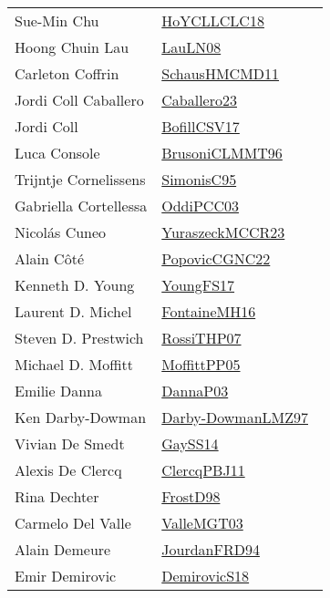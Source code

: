 {\begin{longtable}{p{4cm}p{20cm}}
Sue{-}Min Chu & \href{papers/HoYCLLCLC18.pdf}{HoYCLLCLC18}~\cite{HoYCLLCLC18}\\
Hoong Chuin Lau & \href{papers/LauLN08.pdf}{LauLN08}~\cite{LauLN08}\\
Carleton Coffrin & \href{articles/SchausHMCMD11.pdf}{SchausHMCMD11}~\cite{SchausHMCMD11}\\
Jordi Coll Caballero & \href{articles/Caballero23.pdf}{Caballero23}~\cite{Caballero23}\\
Jordi Coll & \href{papers/BofillCSV17.pdf}{BofillCSV17}~\cite{BofillCSV17}\\
Luca Console & \href{papers/BrusoniCLMMT96.pdf}{BrusoniCLMMT96}~\cite{BrusoniCLMMT96}\\
Trijntje Cornelissens & \href{papers/SimonisC95.pdf}{SimonisC95}~\cite{SimonisC95}\\
Gabriella Cortellessa & \href{papers/OddiPCC03.pdf}{OddiPCC03}~\cite{OddiPCC03}\\
Nicol{\'{a}}s Cuneo & \href{articles/YuraszeckMCCR23.pdf}{YuraszeckMCCR23}~\cite{YuraszeckMCCR23}\\
Alain C{\^{o}}t{\'{e}} & \href{papers/PopovicCGNC22.pdf}{PopovicCGNC22}~\cite{PopovicCGNC22}\\
Kenneth D. Young & \href{papers/YoungFS17.pdf}{YoungFS17}~\cite{YoungFS17}\\
Laurent D. Michel & \href{papers/FontaineMH16.pdf}{FontaineMH16}~\cite{FontaineMH16}\\
Steven D. Prestwich & \href{papers/RossiTHP07.pdf}{RossiTHP07}~\cite{RossiTHP07}\\
Michael D. Moffitt & \href{papers/MoffittPP05.pdf}{MoffittPP05}~\cite{MoffittPP05}\\
Emilie Danna & \href{papers/DannaP03.pdf}{DannaP03}~\cite{DannaP03}\\
Ken Darby{-}Dowman & \href{articles/Darby-DowmanLMZ97.pdf}{Darby-DowmanLMZ97}~\cite{Darby-DowmanLMZ97}\\
Vivian De Smedt & \href{papers/GaySS14.pdf}{GaySS14}~\cite{GaySS14}\\
Alexis De Clercq & \href{papers/ClercqPBJ11.pdf}{ClercqPBJ11}~\cite{ClercqPBJ11}\\
Rina Dechter & \href{papers/FrostD98.pdf}{FrostD98}~\cite{FrostD98}\\
Carmelo Del Valle & \href{papers/ValleMGT03.pdf}{ValleMGT03}~\cite{ValleMGT03}\\
Alain Demeure & \href{}{JourdanFRD94}~\cite{JourdanFRD94}\\
Emir Demirovic & \href{papers/DemirovicS18.pdf}{DemirovicS18}~\cite{DemirovicS18}\\

\end{longtable}}
